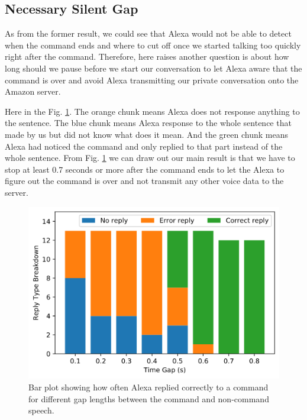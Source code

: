 \subsection{Necessary Silent Gap}

As from the former result, we could see that Alexa would not be able to detect when the command ends and where to cut off once we started talking too quickly right after the command. Therefore, here raises another question is about how long should we pause before we start our conversation to let Alexa aware that the command is over and avoid Alexa transmitting our private conversation onto the Amazon server.

Here in the Fig. \ref{fig:gap}. The orange chunk means Alexa does not response anything to the sentence. The blue chunk means Alexa response to the whole sentence that made by us but did not know what does it mean. And the green chunk means Alexa had noticed the command and only replied to that part instead of the whole sentence. From Fig. \ref{fig:gap} we can draw out our main result is that we have to stop at least 0.7 seconds or more after the command ends to let the Alexa to figure out the command is over and not transmit any other voice data to the server.

\begin{figure}[ht]
	\centering
	\includegraphics[scale=0.4]{../measurement/results/1207night/reply_type_breakdown}
	\caption{Bar plot showing how often Alexa replied correctly to a command for different gap lengths between the command and non-command speech.}
	\label{fig:gap}
	\vspace{-3mm}
	\end{figure}

